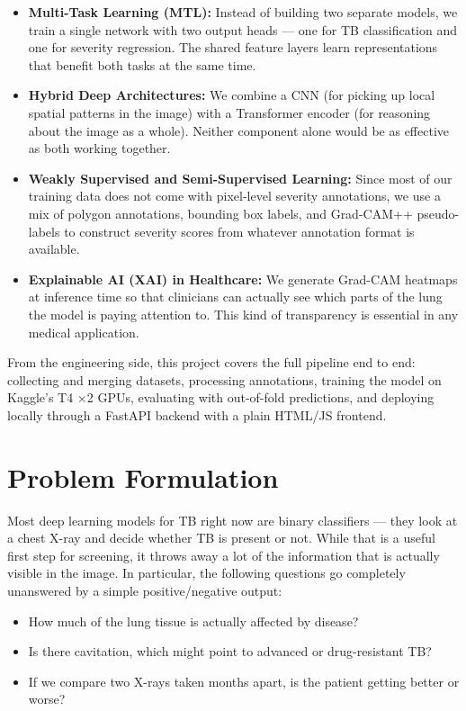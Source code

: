 \documentclass[12pt]{report}
\begin{document}
\begin{itemize}
    \item \textbf{Multi-Task Learning (MTL):} Instead of building two separate models, we train a single network with two output heads --- one for TB classification and one for severity regression. The shared feature layers learn representations that benefit both tasks at the same time.

    \item \textbf{Hybrid Deep Architectures:} We combine a CNN (for picking up local spatial patterns in the image) with a Transformer encoder (for reasoning about the image as a whole). Neither component alone would be as effective as both working together.

    \item \textbf{Weakly Supervised and Semi-Supervised Learning:} Since most of our training data does not come with pixel-level severity annotations, we use a mix of polygon annotations, bounding box labels, and Grad-CAM++ pseudo-labels to construct severity scores from whatever annotation format is available.

    \item \textbf{Explainable AI (XAI) in Healthcare:} We generate Grad-CAM heatmaps at inference time so that clinicians can actually see which parts of the lung the model is paying attention to. This kind of transparency is essential in any medical application.
\end{itemize}

From the engineering side, this project covers the full pipeline end to end: collecting and merging datasets, processing annotations, training the model on Kaggle's T4 $\times$2 GPUs, evaluating with out-of-fold predictions, and deploying locally through a FastAPI backend with a plain HTML/JS frontend.

\section{Problem Formulation}

Most deep learning models for TB right now are binary classifiers --- they look at a chest X-ray and decide whether TB is present or not. While that is a useful first step for screening, it throws away a lot of the information that is actually visible in the image. In particular, the following questions go completely unanswered by a simple positive/negative output:

\begin{itemize}
    \item How much of the lung tissue is actually affected by disease?
    \item Is there cavitation, which might point to advanced or drug-resistant TB?
    \item If we compare two X-rays taken months apart, is the patient getting better or worse?
\end{itemize}
\end{document}
